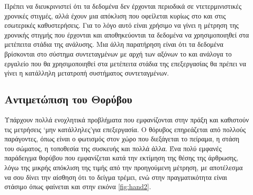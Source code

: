 Πρέπει να διευκρινιστεί ότι τα δεδομένα δεν έρχονται περιοδικά σε ντετερμινιστικές χρονικές στιγμές, αλλά έχουν μια απόκλιση που οφείλεται κυρίως στο  και στις εσωτερικές καθυστερήσεις. Για το λόγο αυτό είναι χρήσιμο να γίνει η μέτρηση της χρονικής στιγμής που έρχονται και αποθηκεύονται τα δεδομένα να χρησιμοποιηθεί στα μετέπειτα στάδια της ανάλυσης. Μια άλλη παρατήρηση είναι ότι τα δεδομένα βρίσκονται στο σύστημα συντεταγμένων με αρχή των αξόνων το  και ανάλογα το εργαλείο που θα χρησιμοποιηθεί στα μετέπειτα στάδια της επεξεργασίας θα πρέπει να γίνει η κατάλληλη μετατροπή συστήματος συντεταγμένων.

\subsection{Αντιμετώπιση του Θορύβου}

Υπάρχουν πολλά ενοχλητικά προβλήματα που εμφανίζονται στην πράξη και καθιστούν τις μετρήσεις \lq μην κατάλληλες\rq  για επεξεργασία. Ο θόρυβος επηρεάζεται από πολλούς παράγοντες, όπως είναι ο φωτισμός στον χώρο που διεξάγεται το πείραμα, η στάση του σώματος, η τοποθεσία της συσκευής και πολλά άλλα. Ένα πολύ εμφανές παράδειγμα θορύβου που εμφανίζεται κατά την εκτίμηση της θέσης της άρθρωσης, λόγω της μικρής απόκλιση της τιμής από την προηγούμενη μέτρηση, με αποτέλεσμα να σου δίνει την αίσθηση ότι το δείγμα τρέμει, ενώ στην πραγματικότητα είναι στάσιμο όπως φαίνεται και στην εικόνα \ref{fig:hand2}.

